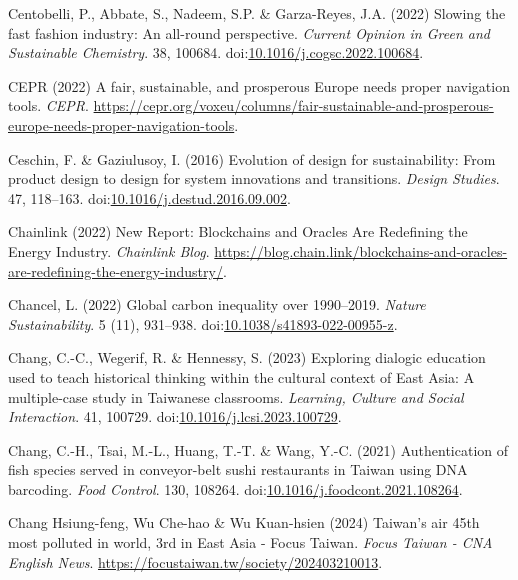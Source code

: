 \documentclass[
  letterpaper,
  DIV=11,
  numbers=noendperiod]{scrartcl}
\newlength{\cslhangindent}
\newenvironment{CSLReferences}[2] %
 {\begin{list}{}{%
  \setlength{\itemindent}{0pt}
  \setlength{\leftmargin}{0pt}
  \setlength{\parsep}{0pt}
  \ifodd #1
   \setlength{\leftmargin}{\cslhangindent}
   \setlength{\itemindent}{-1\cslhangindent}
  \fi
  \setlength{\itemsep}{#2\baselineskip}}}
 {\end{list}}
\begin{document}
\begin{CSLReferences}{0}{1}
Centobelli, P., Abbate, S., Nadeem, S.P. \& Garza-Reyes, J.A. (2022)
Slowing the fast fashion industry: {An} all-round perspective.
\emph{Current Opinion in Green and Sustainable Chemistry}. 38, 100684.
doi:\href{https://doi.org/10.1016/j.cogsc.2022.100684}{10.1016/j.cogsc.2022.100684}.

CEPR (2022) A fair, sustainable, and prosperous {Europe} needs proper
navigation tools. \emph{CEPR}.
\url{https://cepr.org/voxeu/columns/fair-sustainable-and-prosperous-europe-needs-proper-navigation-tools}.

Ceschin, F. \& Gaziulusoy, I. (2016) Evolution of design for
sustainability: {From} product design to design for system innovations
and transitions. \emph{Design Studies}. 47, 118--163.
doi:\href{https://doi.org/10.1016/j.destud.2016.09.002}{10.1016/j.destud.2016.09.002}.

Chainlink (2022) New {Report}: {Blockchains} and {Oracles Are
Redefining} the {Energy Industry}. \emph{Chainlink Blog}.
\url{https://blog.chain.link/blockchains-and-oracles-are-redefining-the-energy-industry/}.

Chancel, L. (2022) Global carbon inequality over 1990--2019.
\emph{Nature Sustainability}. 5 (11), 931--938.
doi:\href{https://doi.org/10.1038/s41893-022-00955-z}{10.1038/s41893-022-00955-z}.

Chang, C.-C., Wegerif, R. \& Hennessy, S. (2023) Exploring dialogic
education used to teach historical thinking within the cultural context
of {East Asia}: {A} multiple-case study in {Taiwanese} classrooms.
\emph{Learning, Culture and Social Interaction}. 41, 100729.
doi:\href{https://doi.org/10.1016/j.lcsi.2023.100729}{10.1016/j.lcsi.2023.100729}.

Chang, C.-H., Tsai, M.-L., Huang, T.-T. \& Wang, Y.-C. (2021)
Authentication of fish species served in conveyor-belt sushi restaurants
in {Taiwan} using {DNA} barcoding. \emph{Food Control}. 130, 108264.
doi:\href{https://doi.org/10.1016/j.foodcont.2021.108264}{10.1016/j.foodcont.2021.108264}.

Chang Hsiung-feng, Wu Che-hao \& Wu Kuan-hsien (2024) Taiwan's air 45th
most polluted in world, 3rd in {East Asia} - {Focus Taiwan}. \emph{Focus
Taiwan - CNA English News}.
\url{https://focustaiwan.tw/society/202403210013}.


\end{CSLReferences}
\end{document}
